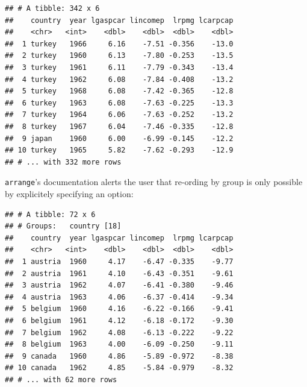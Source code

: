 \documentclass[]{gitbook}
\newenvironment{Shaded}{\begin{snugshade}}{\end{snugshade}}
\newcommand{\DataTypeTok}[1]{\textcolor[rgb]{0.13,0.29,0.53}{#1}}
\newcommand{\DecValTok}[1]{\textcolor[rgb]{0.00,0.00,0.81}{#1}}
\newcommand{\KeywordTok}[1]{\textcolor[rgb]{0.13,0.29,0.53}{\textbf{#1}}}
\newcommand{\NormalTok}[1]{#1}
\newcommand{\OperatorTok}[1]{\textcolor[rgb]{0.81,0.36,0.00}{\textbf{#1}}}
\newcommand{\OtherTok}[1]{\textcolor[rgb]{0.56,0.35,0.01}{#1}}
\newcommand{\StringTok}[1]{\textcolor[rgb]{0.31,0.60,0.02}{#1}}
\theoremstyle{definition}
\theoremstyle{definition}
\theoremstyle{definition}
\theoremstyle{remark}
\begin{document}
\begin{Shaded}
\end{Shaded}

\begin{verbatim}
## # A tibble: 342 x 6
##    country  year lgaspcar lincomep  lrpmg lcarpcap
##    <chr>   <int>    <dbl>    <dbl>  <dbl>    <dbl>
##  1 turkey   1966     6.16    -7.51 -0.356    -13.0
##  2 turkey   1960     6.13    -7.80 -0.253    -13.5
##  3 turkey   1961     6.11    -7.79 -0.343    -13.4
##  4 turkey   1962     6.08    -7.84 -0.408    -13.2
##  5 turkey   1968     6.08    -7.42 -0.365    -12.8
##  6 turkey   1963     6.08    -7.63 -0.225    -13.3
##  7 turkey   1964     6.06    -7.63 -0.252    -13.2
##  8 turkey   1967     6.04    -7.46 -0.335    -12.8
##  9 japan    1960     6.00    -6.99 -0.145    -12.2
## 10 turkey   1965     5.82    -7.62 -0.293    -12.9
## # ... with 332 more rows
\end{verbatim}

\texttt{arrange}'s documentation alerts the user that re-ording by group
is only possible by explicitely specifying an option:

\begin{Shaded}
\end{Shaded}

\begin{verbatim}
## # A tibble: 72 x 6
## # Groups:   country [18]
##    country  year lgaspcar lincomep  lrpmg lcarpcap
##    <chr>   <int>    <dbl>    <dbl>  <dbl>    <dbl>
##  1 austria  1960     4.17    -6.47 -0.335    -9.77
##  2 austria  1961     4.10    -6.43 -0.351    -9.61
##  3 austria  1962     4.07    -6.41 -0.380    -9.46
##  4 austria  1963     4.06    -6.37 -0.414    -9.34
##  5 belgium  1960     4.16    -6.22 -0.166    -9.41
##  6 belgium  1961     4.12    -6.18 -0.172    -9.30
##  7 belgium  1962     4.08    -6.13 -0.222    -9.22
##  8 belgium  1963     4.00    -6.09 -0.250    -9.11
##  9 canada   1960     4.86    -5.89 -0.972    -8.38
## 10 canada   1962     4.85    -5.84 -0.979    -8.32
## # ... with 62 more rows
\end{verbatim}
\end{document}
